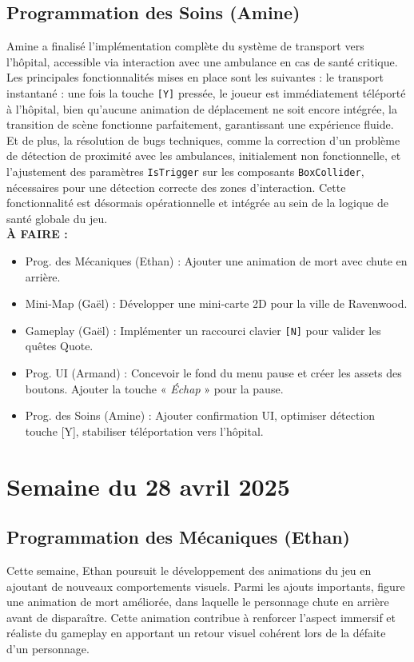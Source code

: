 \documentclass{report}
\begin{document}
\subsection*{Programmation des Soins (Amine)}
Amine a finalisé l’implémentation complète du système de transport vers l’hôpital, accessible via interaction avec une ambulance en cas de santé critique. Les principales fonctionnalités mises en place sont les suivantes : le transport instantané : une fois la touche \texttt{[Y]} pressée, le joueur est immédiatement téléporté à l’hôpital, bien qu’aucune animation de déplacement ne soit encore intégrée, la transition de scène fonctionne parfaitement, garantissant une expérience fluide. Et de plus, la résolution de bugs techniques, comme la correction d’un problème de détection de proximité avec les ambulances, initialement non fonctionnelle, et l’ajustement des paramètres \texttt{IsTrigger} sur les composants \texttt{BoxCollider}, nécessaires pour une détection correcte des zones d’interaction. Cette fonctionnalité est désormais opérationnelle et intégrée au sein de la logique de santé globale du jeu.
\\[1cm]
\textbf{À FAIRE :}
\begin{itemize}
\item Prog. des Mécaniques (Ethan) : Ajouter une animation de mort avec chute en arrière.
\item Mini-Map (Gaël) : Développer une mini-carte 2D pour la ville de Ravenwood.
\item Gameplay (Gaël) : Implémenter un raccourci clavier \texttt{[N]} pour valider les quêtes Quote.
\item Prog. UI (Armand) : Concevoir le fond du menu pause et créer les assets des boutons. Ajouter la touche « \textit{Échap} » pour la pause.
\item Prog. des Soins (Amine) : Ajouter confirmation UI, optimiser détection touche [Y], stabiliser téléportation vers l’hôpital.
\end{itemize}


\newpage
\section{Semaine du 28 avril 2025}

\subsection*{Programmation des Mécaniques (Ethan)}
Cette semaine, Ethan poursuit le développement des animations du jeu en ajoutant de nouveaux comportements visuels. Parmi les ajouts importants, figure une animation de mort améliorée, dans laquelle le personnage chute en arrière avant de disparaître. Cette animation contribue à renforcer l'aspect immersif et réaliste du gameplay en apportant un retour visuel cohérent lors de la défaite d’un personnage.
\end{document}

